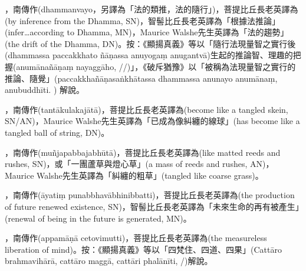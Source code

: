 \startitemgroup[noteitems]
\item{}，南傳作(dhammanvayo，另譯為「法的類推，法的隨行」)，菩提比丘長老英譯為(by inference from the Dhamma, SN)，智髻比丘長老英譯為「根據法推論」(infer…according to Dhamma, MN)，Maurice Walshe先生英譯為「法的趨勢」(the drift of the Dhamma, DN)。按：《顯揚真義》等以「隨行法現量智之實行後(dhammassa paccakkhato ñāṇassa anuyogaṃ anugantvā)生起的推論智、理趣的把握(anumānañāṇaṃ nayaggāho, //)」，《破斥猶豫》以「被稱為法現量智之實行的推論、隨覺」(paccakkhañāṇasaṅkhātassa dhammassa anunayo anumānaṃ, anubuddhīti. ) 解說。
\stopitemgroup

\startitemgroup[noteitems]
\item{}，南傳作(tantākulakajātā)，菩提比丘長老英譯為(become like a tangled skein, SN/AN)，Maurice Walshe先生英譯為「已成為像糾纏的線球」(has become like a tangled ball of string, DN)。
\stopitemgroup

\startitemgroup[noteitems]
\item{}，南傳作(muñjapabbajabhūtā)，菩提比丘長老英譯為(like matted reeds and rushes, SN)，或「一團蘆草與燈心草」(a mass of reeds and rushes, AN)，Maurice Walshe先生英譯為「糾纏的粗草」(tangled like coarse grass)。
\stopitemgroup

\startitemgroup[noteitems]
\item{}，南傳作(āyatiṃ punabbhavābhinibbatti)，菩提比丘長老英譯為(the production of future renewed existence, SN)，智髻比丘長老英譯為「未來生命的再有被產生」(renewal of being in the future is generated, MN)。
\stopitemgroup

\startitemgroup[noteitems]
\item{}，南傳作(appamāṇā cetovimutti)，菩提比丘長老英譯為(the measureless liberation of mind)。按：《顯揚真義》等以「四梵住、四道、四果」(Cattāro brahmavihārā, cattāro maggā, cattāri phalānīti, /)解說。
\stopitemgroup

